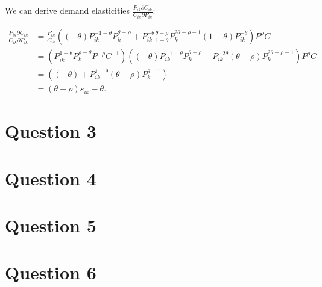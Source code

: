 \documentclass[11pt]{article} %
\begin{document}
We can derive demand elasticities $\frac{P_{ik}\partial C_{ik}}{C_{ik}\partial P_{ik}}$:

\begin{align*}
\frac{P_{ik}\partial C_{ik}}{C_{ik}\partial P_{ik}} &= \frac{P_{ik}}{C_{ik}}\left( (-\theta)P_{ik}^{-1-\theta}P_{k}^{\theta - \rho} + P_{ik}^{-\theta} \frac{ \theta-\rho}{1-\theta } P_{k}^{2\theta - \rho - 1}(1-\theta)P_{ik}^{-\theta}  \right) P^{\rho} C\\
&=\left(P_{ik}^{1+\theta} P_{k}^{\rho - \theta} P^{-\rho} C^{-1} \right)\left( (-\theta)P_{ik}^{-1-\theta}P_{k}^{\theta - \rho} + P_{ik}^{-2\theta} (\theta-\rho) P_{k}^{2\theta - \rho - 1}  \right) P^{\rho} C\\
&=\left( (-\theta) + P_{ik}^{1-\theta} (\theta-\rho) P_{k}^{\theta  - 1}  \right) \\
&= (\theta - \rho)s_{ik} - \theta.
\end{align*}
\section{Question 3}
\section{Question 4}
\section{Question 5}
\section{Question 6}
\end{document}
